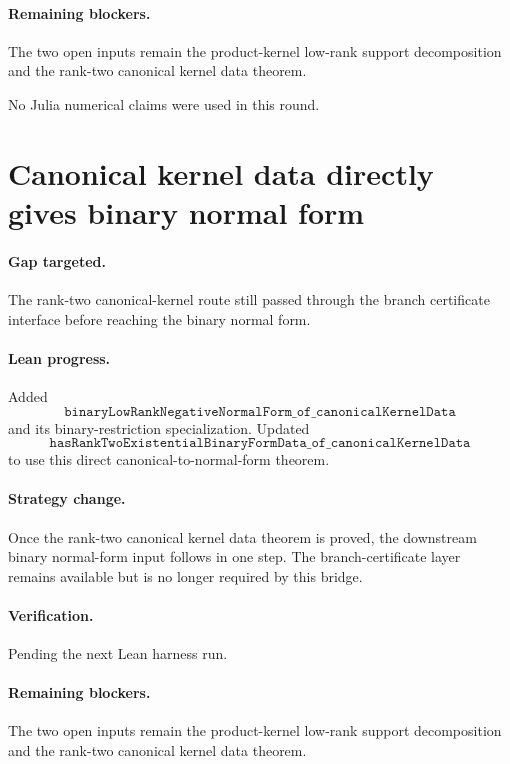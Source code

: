 \documentclass[11pt]{article}
\begin{document}
\paragraph{Remaining blockers.}
The two open inputs remain the product-kernel low-rank support decomposition
and the rank-two canonical kernel data theorem.

No Julia numerical claims were used in this round.

\section*{Canonical kernel data directly gives binary normal form}

\paragraph{Gap targeted.}
The rank-two canonical-kernel route still passed through the branch
certificate interface before reaching the binary normal form.

\paragraph{Lean progress.}
Added
\[
\texttt{binaryLowRankNegativeNormalForm\_of\_canonicalKernelData}
\]
and its binary-restriction specialization.  Updated
\[
\texttt{hasRankTwoExistentialBinaryFormData\_of\_canonicalKernelData}
\]
to use this direct canonical-to-normal-form theorem.

\paragraph{Strategy change.}
Once the rank-two canonical kernel data theorem is proved, the downstream
binary normal-form input follows in one step.  The branch-certificate layer
remains available but is no longer required by this bridge.

\paragraph{Verification.}
Pending the next Lean harness run.

\paragraph{Remaining blockers.}
The two open inputs remain the product-kernel low-rank support decomposition
and the rank-two canonical kernel data theorem.
\end{document}
